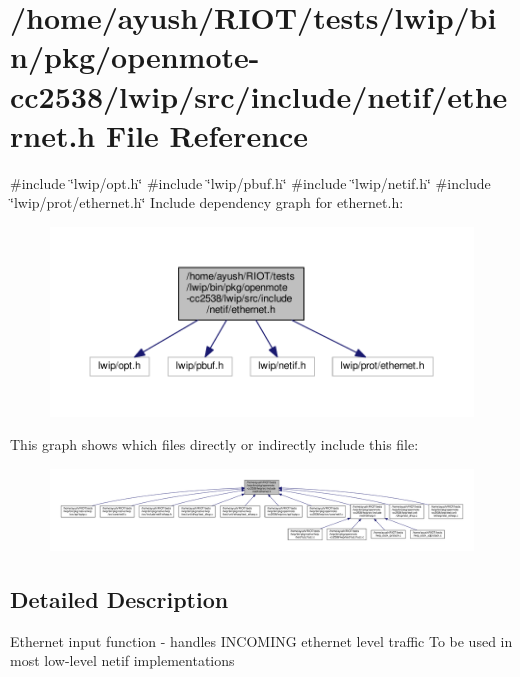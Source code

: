 \hypertarget{openmote-cc2538_2lwip_2src_2include_2netif_2ethernet_8h}{}\section{/home/ayush/\+R\+I\+O\+T/tests/lwip/bin/pkg/openmote-\/cc2538/lwip/src/include/netif/ethernet.h File Reference}
\label{openmote-cc2538_2lwip_2src_2include_2netif_2ethernet_8h}
{\ttfamily \#include \char`\"{}lwip/opt.\+h\char`\"{}}\newline
{\ttfamily \#include \char`\"{}lwip/pbuf.\+h\char`\"{}}\newline
{\ttfamily \#include \char`\"{}lwip/netif.\+h\char`\"{}}\newline
{\ttfamily \#include \char`\"{}lwip/prot/ethernet.\+h\char`\"{}}\newline
Include dependency graph for ethernet.\+h\+:
\nopagebreak
\begin{figure}[H]
\begin{center}
\leavevmode
\includegraphics[width=350pt]{openmote-cc2538_2lwip_2src_2include_2netif_2ethernet_8h__incl}
\end{center}
\end{figure}
This graph shows which files directly or indirectly include this file\+:
\nopagebreak
\begin{figure}[H]
\begin{center}
\leavevmode
\includegraphics[width=350pt]{openmote-cc2538_2lwip_2src_2include_2netif_2ethernet_8h__dep__incl}
\end{center}
\end{figure}


\subsection{Detailed Description}
Ethernet input function -\/ handles I\+N\+C\+O\+M\+I\+NG ethernet level traffic To be used in most low-\/level netif implementations 